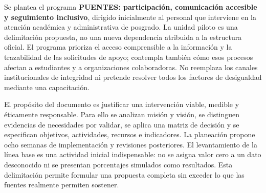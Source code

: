 \documentclass[12pt,letterpaper,oneside]{article}
\begin{document}
Se plantea el programa \textbf{PUENTES: participación, comunicación accesible y seguimiento inclusivo}, dirigido inicialmente al personal que interviene en la atención académica y administrativa de posgrado. La unidad piloto es una delimitación propuesta, no una nueva dependencia atribuida a la estructura oficial. El programa prioriza el acceso comprensible a la información y la trazabilidad de las solicitudes de apoyo; contempla también cómo esos procesos afectan a estudiantes y a organizaciones colaboradoras. No reemplaza los canales institucionales de integridad ni pretende resolver todos los factores de desigualdad mediante una capacitación.

El propósito del documento es justificar una intervención viable, medible y éticamente responsable. Para ello se analizan misión y visión, se distinguen evidencias de necesidades por validar, se aplica una matriz de decisión y se especifican objetivos, actividades, recursos e indicadores. La planeación propone ocho semanas de implementación y revisiones posteriores. El levantamiento de la línea base es una actividad inicial indispensable: no se asigna valor cero a un dato desconocido ni se presentan porcentajes simulados como resultados. Esta delimitación permite formular una propuesta completa sin exceder lo que las fuentes realmente permiten sostener.
\end{document}

